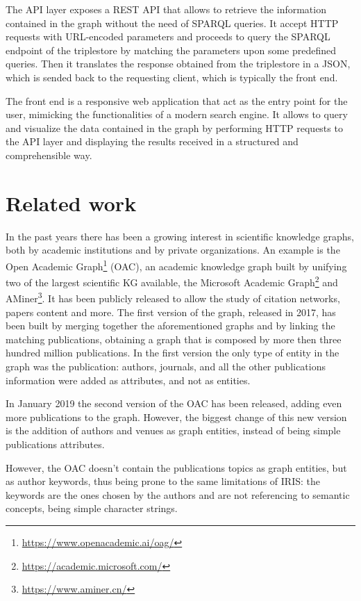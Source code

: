 \documentclass[%
    corpo=13.5pt,
    twoside,
    oldstyle,
    tipotesi=magistrale,
    greek,
    evenboxes
]{toptesi}
\begin{document}
The API layer exposes a REST API that allows to retrieve the information
contained in the graph without the need of SPARQL queries. It accept HTTP
requests with URL-encoded parameters and proceeds to query the SPARQL endpoint
of the triplestore by matching the parameters upon some predefined queries.
Then it translates the response obtained from the triplestore in a JSON,
which is sended back to the requesting client, which is typically the front end.

The front end is a responsive web application that act as the entry point for
the user, mimicking the functionalities of a modern search engine. It allows
to query and visualize the data contained in the graph by
performing HTTP requests to the API layer and displaying the results received
in a structured and comprehensible way.


\chapter{Related work}

In the past years there has been a growing interest in scientific
knowledge graphs, both by academic institutions and by private organizations.
An example is the Open Academic
Graph\footnote{\url{https://www.openacademic.ai/oag/}} (OAC), an academic
knowledge graph built by unifying two of the largest
scientific KG available, the Microsoft Academic
Graph\footnote{\url{https://academic.microsoft.com/}}
and AMiner\footnote{\url{https://www.aminer.cn/}}.
It has been publicly released to allow
the study of citation networks, papers content and more.
The first version of the graph, released in 2017, has been
built by merging together the aforementioned graphs and by linking the
matching publications, obtaining a graph that is composed by more then three
hundred million publications. In the first version the only type of entity
in the graph was the publication: authors, journals, and all the other
publications information were added as attributes, and not as entities.

In January 2019 the second version of the OAC has been released, adding even
more publications to the graph. However, the biggest change of this new
version is the addition of authors and venues as graph entities,
instead of being simple publications attributes.

However, the OAC doesn't contain the publications topics as graph
entities, but as author keywords, thus being prone to the same limitations of
IRIS: the keywords are the ones chosen by the authors and are not
referencing to semantic concepts, being simple character strings.
\newline
\end{document}
